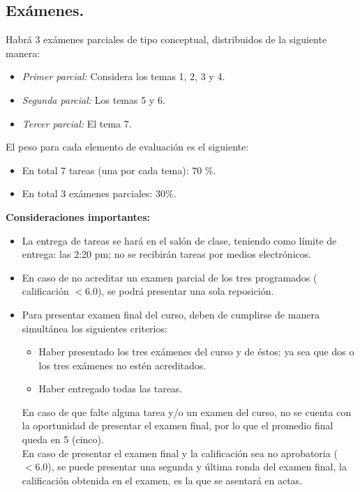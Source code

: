 \documentclass[12pt]{article}
\begin{document}
\subsection{Exámenes.}
Habrá 3 exámenes parciales de tipo conceptual, distribuidos de la siguiente manera:
\begin{itemize}
\item \emph{Primer parcial:} Considera los temas 1, 2, 3 y 4.
\item \emph{Segunda parcial:} Los temas 5 y 6.
\item \emph{Tercer parcial:} El tema 7.
\end{itemize}
El peso para cada elemento de evaluación es el siguiente:
\begin{itemize}
\setlength{\itemsep}{0mm}
\item En total 7 tareas (una por cada tema): \hspace{1cm} 70 \%.
\item En total 3 exámenes parciales: \hspace{2.5cm} 30\%.
\end{itemize}
\textbf{Consideraciones importantes:}
\begin{itemize}
\setlength{\itemsep}{0mm}
\item La entrega de tareas se hará en el salón de clase, teniendo como límite de entrega: las 2:20 pm; no se recibirán tareas por medios electrónicos.
\item En caso de no acreditar un examen parcial de los tres programados ( calificación $<6.0$), se podrá presentar una sola reposición.
\item Para presentar examen final del curso, deben de cumplirse de manera simultánea los siguientes criterios:
\begin{itemize}
\item Haber presentado los tres exámenes del curso y de éstos: ya sea que dos o los tres exámenes no estén acreditados.
\item Haber entregado todas las tareas.
\end{itemize}  
En caso de que falte alguna tarea y/o un examen del curso, no se cuenta con la oportunidad de presentar el examen final, por lo que el promedio final queda en 5 (cinco).
\\
En caso de presentar el examen final y la calificación sea no aprobatoria ($<6.0$), se puede presentar una segunda y última ronda del examen final, la calificación obtenida en el examen, es la que se asentará en actas.
\end{itemize}
\end{document}
